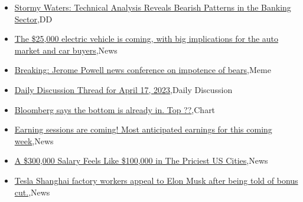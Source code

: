 \documentclass{article}%
\begin{document}
%
\begin{itemize}%
\item%
\href{https://reddit.com/r/wallstreetbets/comments/12pd6nz/stormy\_waters\_technical\_analysis\_reveals\_bearish/}{Stormy Waters: Technical Analysis Reveals Bearish Patterns in the Banking Sector},DD%
\item%
\href{https://reddit.com/r/wallstreetbets/comments/12pc7ba/the\_25000\_electric\_vehicle\_is\_coming\_with\_big/}{The \$25,000 electric vehicle is coming, with big implications for the auto market and car buyers},News%
\item%
\href{https://reddit.com/r/wallstreetbets/comments/12pbl6q/breaking\_jerome\_powell\_news\_conference\_on/}{Breaking: Jerome Powell news conference on impotence of bears},Meme%
\item%
\href{https://reddit.com/r/wallstreetbets/comments/12pabu7/daily\_discussion\_thread\_for\_april\_17\_2023/}{Daily Discussion Thread for April 17, 2023},Daily Discussion%
\item%
\href{https://reddit.com/r/wallstreetbets/comments/12p69fp/bloomberg\_says\_the\_bottom\_is\_already\_in\_top/}{Bloomberg says the bottom is already in. Top ??},Chart%
\item%
\href{https://reddit.com/r/StockMarket/comments/12p6l5g/earning\_sessions\_are\_coming\_most\_anticipated/}{Earning sessions are coming! Most anticipated earnings for this coming week},News%
\item%
\href{https://reddit.com/r/Economics/comments/12pc71u/a\_300000\_salary\_feels\_like\_100000\_in\_the\_priciest/}{A \$300,000 Salary Feels Like \$100,000 in The Priciest US Cities},News%
\item%
\href{https://reddit.com/r/Economics/comments/12p4kir/tesla\_shanghai\_factory\_workers\_appeal\_to\_elon/}{Tesla Shanghai factory workers appeal to Elon Musk after being told of bonus cut.},News%
\end{itemize}%
\end{document}
